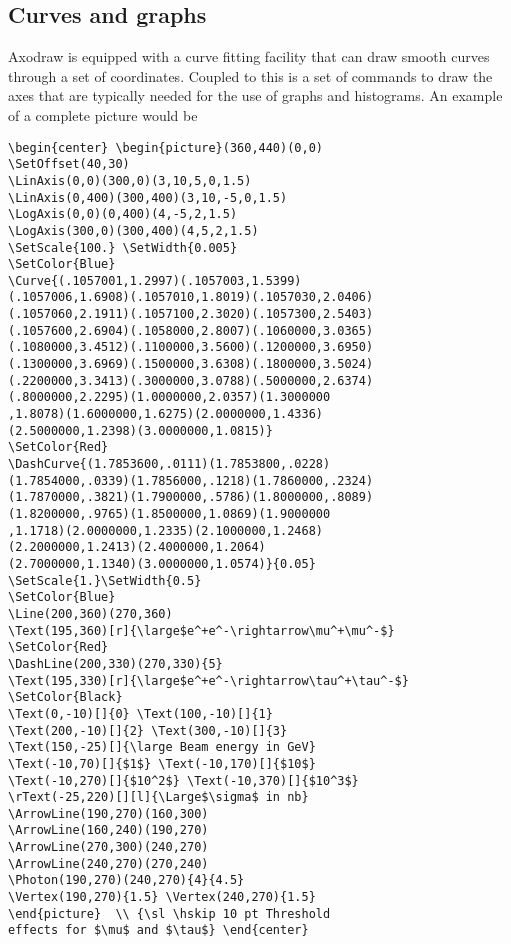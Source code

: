 \subsection{Curves and graphs}

Axodraw is equipped with a curve fitting facility that can draw smooth 
curves through a set of coordinates. Coupled to this is a set of 
commands to draw the axes that are typically needed for the use of 
graphs and histograms. An example of a complete picture would be
\IfColor{\textBlue}{}
\begin{verbatim}
\begin{center} \begin{picture}(360,440)(0,0)
\SetOffset(40,30)
\LinAxis(0,0)(300,0)(3,10,5,0,1.5)
\LinAxis(0,400)(300,400)(3,10,-5,0,1.5)
\LogAxis(0,0)(0,400)(4,-5,2,1.5)
\LogAxis(300,0)(300,400)(4,5,2,1.5)
\SetScale{100.} \SetWidth{0.005}
\SetColor{Blue}
\Curve{(.1057001,1.2997)(.1057003,1.5399)
(.1057006,1.6908)(.1057010,1.8019)(.1057030,2.0406)
(.1057060,2.1911)(.1057100,2.3020)(.1057300,2.5403)
(.1057600,2.6904)(.1058000,2.8007)(.1060000,3.0365)
(.1080000,3.4512)(.1100000,3.5600)(.1200000,3.6950)
(.1300000,3.6969)(.1500000,3.6308)(.1800000,3.5024)
(.2200000,3.3413)(.3000000,3.0788)(.5000000,2.6374)
(.8000000,2.2295)(1.0000000,2.0357)(1.3000000
,1.8078)(1.6000000,1.6275)(2.0000000,1.4336)
(2.5000000,1.2398)(3.0000000,1.0815)}
\SetColor{Red}
\DashCurve{(1.7853600,.0111)(1.7853800,.0228)
(1.7854000,.0339)(1.7856000,.1218)(1.7860000,.2324)
(1.7870000,.3821)(1.7900000,.5786)(1.8000000,.8089)
(1.8200000,.9765)(1.8500000,1.0869)(1.9000000
,1.1718)(2.0000000,1.2335)(2.1000000,1.2468)
(2.2000000,1.2413)(2.4000000,1.2064)
(2.7000000,1.1340)(3.0000000,1.0574)}{0.05}
\SetScale{1.}\SetWidth{0.5}
\SetColor{Blue}
\Line(200,360)(270,360)
\Text(195,360)[r]{\large$e^+e^-\rightarrow\mu^+\mu^-$}
\SetColor{Red}
\DashLine(200,330)(270,330){5}
\Text(195,330)[r]{\large$e^+e^-\rightarrow\tau^+\tau^-$}
\SetColor{Black}
\Text(0,-10)[]{0} \Text(100,-10)[]{1}
\Text(200,-10)[]{2} \Text(300,-10)[]{3}
\Text(150,-25)[]{\large Beam energy in GeV}
\Text(-10,70)[]{$1$} \Text(-10,170)[]{$10$}
\Text(-10,270)[]{$10^2$} \Text(-10,370)[]{$10^3$}
\rText(-25,220)[][l]{\Large$\sigma$ in nb}
\ArrowLine(190,270)(160,300)
\ArrowLine(160,240)(190,270)
\ArrowLine(270,300)(240,270)
\ArrowLine(240,270)(270,240)
\Photon(190,270)(240,270){4}{4.5}
\Vertex(190,270){1.5} \Vertex(240,270){1.5}
\end{picture}  \\ {\sl \hskip 10 pt Threshold
effects for $\mu$ and $\tau$} \end{center}
\end{verbatim}

